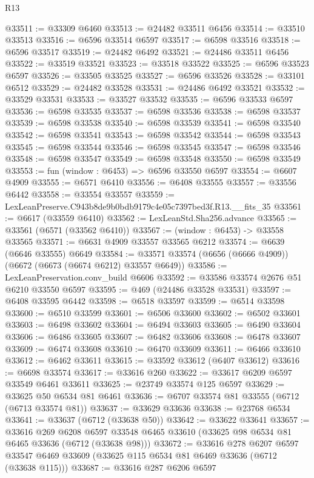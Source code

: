 \begin{lexlean}{R13}
\begin{coremodule}
@33511 := @33309 @6460
@33513 := @24482 @33511 @6456
@33514 := @33510 @33513
@33516 := @6596 @33514 @6597
@33517 := @6598 @33516
@33518 := @6596 @33517
@33519 := @24482 @6492
@33521 := @24486 @33511 @6456
@33522 := @33519 @33521
@33523 := @33518 @33522
@33525 := @6596 @33523 @6597
@33526 := @33505 @33525
@33527 := @6596 @33526
@33528 := @33101 @6512
@33529 := @24482 @33528
@33531 := @24486 @6492 @33521
@33532 := @33529 @33531
@33533 := @33527 @33532
@33535 := @6596 @33533 @6597
@33536 := @6598 @33535
@33537 := @6598 @33536
@33538 := @6598 @33537
@33539 := @6598 @33538
@33540 := @6598 @33539
@33541 := @6598 @33540
@33542 := @6598 @33541
@33543 := @6598 @33542
@33544 := @6598 @33543
@33545 := @6598 @33544
@33546 := @6598 @33545
@33547 := @6598 @33546
@33548 := @6598 @33547
@33549 := @6598 @33548
@33550 := @6598 @33549
@33553 := fun (window : @6453) => @6596 @33550 @6597
@33554 := @6607 @4909
@33555 := @6571 @6410
@33556 := @6408 @33555
@33557 := @33556 @6442
@33558 := @33554 @33557
@33559 := LexLeanPreserve.C943b8de9b0bdb9179c4e05c7397bed3f.R13.__fits_35
@33561 := @6617 (@33559 @6410)
@33562 := LexLeanStd.Sha256.advance
@33565 := @33561 (@6571 (@33562 @6410))
@33567 := (window : @6453) -> @33558 @33565
@33571 := @6631 @4909 @33557 @33565 @6212
@33574 := @6639 (@6646 @33555) @6649
@33584 := @33571 @33574 (@6656 (@6666 @4909)) (@6672 (@6673 (@6674 @6212) @33557 @6649))
@33586 := LexLeanPreservation.conv_build @6606
@33592 := @33586 @33574 @2676 @51 @6210 @33550 @6597
@33595 := @469 (@24486 @33528 @33531)
@33597 := @6408 @33595 @6442
@33598 := @6518 @33597
@33599 := @6514 @33598
@33600 := @6510 @33599
@33601 := @6506 @33600
@33602 := @6502 @33601
@33603 := @6498 @33602
@33604 := @6494 @33603
@33605 := @6490 @33604
@33606 := @6486 @33605
@33607 := @6482 @33606
@33608 := @6478 @33607
@33609 := @6474 @33608
@33610 := @6470 @33609
@33611 := @6466 @33610
@33612 := @6462 @33611
@33615 := @33592 @33612 (@6407 @33612)
@33616 := @6698 @33574
@33617 := @33616 @260
@33622 := @33617 @6209 @6597 @33549 @6461 @33611
@33625 := @23749 @33574 @125 @6597
@33629 := @33625 @50 @6534 @81 @6461
@33636 := @6707 @33574 @81 @33555 (@6712 (@6713 @33574 @81))
@33637 := @33629 @33636
@33638 := @23768 @6534
@33641 := @33637 (@6712 (@33638 @50))
@33642 := @33622 @33641
@33657 := @33616
    @269
    @6208
    @6597
    @33548
    @6465
    @33610
    (@33625 @98 @6534 @81 @6465 @33636 (@6712 (@33638 @98)))
@33672 := @33616
    @278
    @6207
    @6597
    @33547
    @6469
    @33609
    (@33625 @115 @6534 @81 @6469 @33636 (@6712 (@33638 @115)))
@33687 := @33616
    @287
    @6206
    @6597

\end{coremodule}
\end{lexlean}
